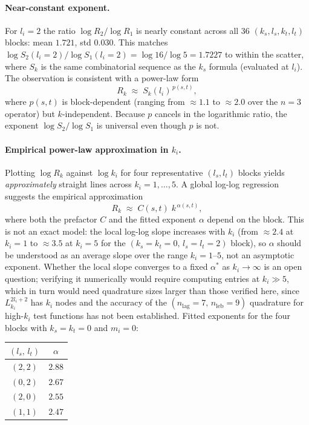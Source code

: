 \documentclass{article}
\begin{document}
\paragraph{Near-constant exponent.}
For $l_i = 2$ the ratio $\log R_2 / \log R_1$ is nearly constant across all
36 $(k_s,l_s,k_t,l_t)$ blocks: mean $1.721$, std $0.030$.
This matches $\log S_2(l_i{=}2)/\log S_1(l_i{=}2) = \log 16/\log 5 = 1.7227$
to within the scatter, where $S_k$ is the same combinatorial sequence as the
$k_s$ formula (evaluated at $l_i$).  The observation is consistent with a
power-law form
\[
  R_k \;\approx\; S_k(l_i)^{\,p(s,t)},
\]
where $p(s,t)$ is block-dependent (ranging from $\approx 1.1$ to $\approx 2.0$
over the $n=3$ operator) but $k$-independent.  Because $p$ cancels in the
logarithmic ratio, the exponent $\log S_2/\log S_1$ is universal even though
$p$ is not.

\paragraph{Empirical power-law approximation in $k_i$.}
Plotting $\log R_k$ against $\log k_i$ for four representative $(l_s,l_t)$ blocks
yields \emph{approximately} straight lines across $k_i = 1,\ldots,5$.
A global log-log regression suggests the empirical approximation
\[
  R_k \;\approx\; C(s,t)\; k^{\,\alpha(s,t)},
\]
where both the prefactor $C$ and the fitted exponent $\alpha$ depend on the block.
This is not an exact model: the local log-log slope increases with $k_i$
(from $\approx 2.4$ at $k_i=1$ to $\approx 3.5$ at $k_i=5$ for the
$(k_s{=}k_t{=}0,\,l_s{=}l_t{=}2)$ block), so $\alpha$ should be understood
as an average slope over the range $k_i=1$--$5$, not an asymptotic exponent.
Whether the local slope converges to a fixed $\alpha^*$ as $k_i \to \infty$
is an open question; verifying it numerically would require computing entries
at $k_i \gg 5$, which in turn would need quadrature sizes larger than those
verified here, since $L_{k_i}^{2l_i+2}$ has $k_i$ nodes and the accuracy of
the $(n_\mathrm{lag}{=}7,\,n_\mathrm{leb}{=}9)$ quadrature for high-$k_i$
test functions has not been established.
Fitted exponents for the four blocks with $k_s = k_t = 0$ and $m_i=0$:

\begin{center}
\begin{tabular}{cc}
\hline
$(l_s,\,l_t)$ & $\alpha$ \\
\hline
$(2,2)$ & $2.88$ \\
$(0,2)$ & $2.67$ \\
$(2,0)$ & $2.55$ \\
$(1,1)$ & $2.47$ \\
\hline
\end{tabular}
\end{center}
\end{document}
